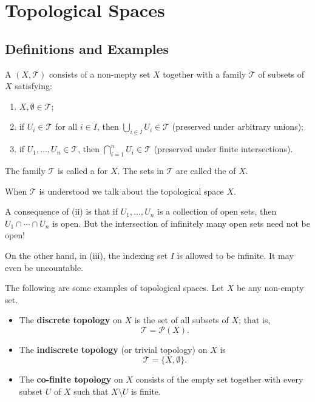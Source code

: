 \chapter{Topological Spaces}\label{chap:topological-spaces}
\section{Definitions and Examples}
\begin{definition}
A  $(X,\mathcal{T})$ consists of a non-mepty set $X$ together with a family $\mathcal{T}$ of subsets of $X$ satisfying:
\begin{enumerate}[label=(\roman*)]
\item $X,\emptyset\in\mathcal{T}$;
\item if $U_i\in\mathcal{T}$ for all $i\in I$, then $\bigcup_{i\in I}U_i\in\mathcal{T}$ (preserved under arbitrary unions);
\item if $U_1,\dots,U_n\in\mathcal{T}$, then $\bigcap_{i=1}^{n}U_i\in\mathcal{T}$ (preserved under finite intersections).
\end{enumerate}
The family $\mathcal{T}$ is called a  for $X$. The sets in $\mathcal{T}$ are called the  of $X$.
\end{definition}

\begin{notation}
When $\mathcal{T}$ is understood we talk about the topological space $X$.
\end{notation}

\begin{remark}
A consequence of (ii) is that if $U_1,\dots,U_n$ is a collection of open sets, then $U_1\cap\cdots\cap U_n$ is open. But the intersection of infinitely many open sets need not be open!

On the other hand, in (iii), the indexing set $I$ is allowed to be infinite. It may even be uncountable.
\end{remark}

\begin{example}
The following are some examples of topological spaces. Let $X$ be any non-empty set.
\begin{itemize}
\item The \textbf{discrete topology} on $X$ is the set of all subsets of $X$; that is,
\[\mathcal{T}=\mathcal{P}(X).\]
\item The \textbf{indiscrete topology} (or trivial topology) on $X$ is
\[\mathcal{T}=\{X,\emptyset\}.\]
\item The \textbf{co-finite topology} on $X$ consists of the empty set together with every subset $U$ of $X$ such that $X\setminus U$ is finite.
\end{itemize}
\end{example}

